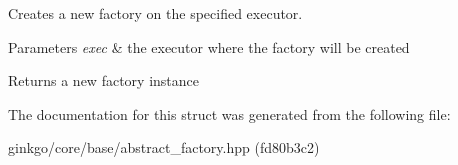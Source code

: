 Creates a new factory on the specified executor. 


\begin{DoxyParams}{Parameters}
{\em exec} & the executor where the factory will be created\\
\hline
\end{DoxyParams}
\begin{DoxyReturn}{Returns}
a new factory instance 
\end{DoxyReturn}


The documentation for this struct was generated from the following file\+:\begin{DoxyCompactItemize}
\item 
ginkgo/core/base/abstract\+\_\+factory.\+hpp (fd80b3c2)\end{DoxyCompactItemize}
